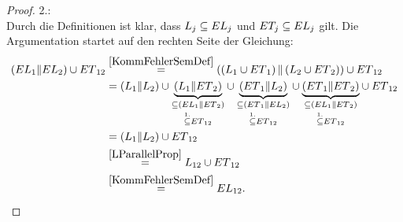 \begin{proof}
  2.:\\
  Durch die Definitionen ist klar, dass $L_j\subseteq EL _j$ und $ET
  _j\subseteq EL _j$ gilt. Die Argumentation startet auf den rechten Seite der
  Gleichung:
  {\allowdisplaybreaks
  \begin{align*}
    (EL{}_1\| EL{}_2)\cup
    ET{}_{12}&\overset{\ref{KommFehlerSemDef}}{=}\left(\left(L_1\cup
    ET{}_1\right)\|\left(L_2\cup ET{}_2\right)\right)\cup ET{}_{12}\\
    &=(L_1\|L_2) \cup \underset{\overset{1.}{\subseteq}
    ET{}_{12}}{\underset{\subseteq
    (EL{}_1\|ET{}_2)}{\underbrace{(L_1\|ET{}_2)}}} \cup
    \underset{\overset{1.}{\subseteq} ET{}_{12}}{\underset{\subseteq
    (ET{}_1\|EL{}_2)}{\underbrace{(ET{}_1\|L_2)}}} \cup
    \underset{\overset{1.}{\subseteq} ET{}_{12}}{\underset{\subseteq
    (EL{}_1\|ET{}_2)}{\underbrace{(ET{}_1\|ET{}_2)}}} \cup ET{}_{12}\\
    &=(L_1\|L_2) \cup ET{}_{12}\\
    &\overset{\ref{LParallelProp}}{=}L_{12}\cup ET{}_{12}\\
    &\overset{\ref{KommFehlerSemDef}}{=}EL{}_{12}.
  \end{align*}}
\end{proof}

